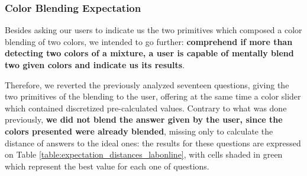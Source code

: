 \subsubsection{Color Blending Expectation}
\label{subsubsec:colorblending_exp}
%
Besides asking our users to indicate us the two primitives which composed a color blending of two colors, we intended to go further: \textbf{comprehend if more than detecting two colors of a mixture, a user
is capable of mentally blend two given colors and indicate us its results}. \par
%
Therefore, we reverted the previously analyzed seventeen questions, giving the two primitives of the blending to the user, offering at the same time a color slider which contained discretized pre-calculated
values. Contrary to what was done previously, \textbf{we did not blend the answer given by the user,
since the colors presented were already blended}, missing only to calculate the distance of answers to the ideal ones: the results for these questions are expressed on Table \ref{table:expectation_distances_labonline},
with cells shaded in green which represent the best value for each one of questions. \par
%
